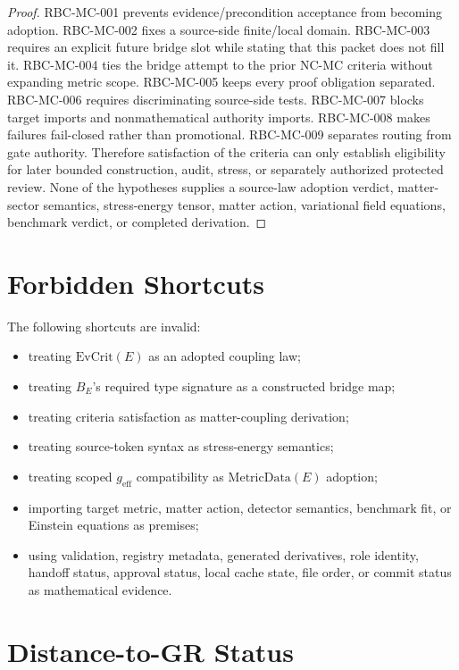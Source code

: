 \documentclass[11pt]{article}
\newcommand{\MetricData}{\mathrm{MetricData}}
\newcommand{\geff}{g_{\mathrm{eff}}}
\newcommand{\EvCrit}{\mathrm{EvCrit}}
\begin{document}
\begin{proof}
RBC-MC-001 prevents evidence/precondition acceptance from becoming adoption.
RBC-MC-002 fixes a source-side finite/local domain. RBC-MC-003 requires an
explicit future bridge slot while stating that this packet does not fill it.
RBC-MC-004 ties the bridge attempt to the prior NC-MC criteria without
expanding metric scope. RBC-MC-005 keeps every proof obligation separated.
RBC-MC-006 requires discriminating source-side tests. RBC-MC-007 blocks target
imports and nonmathematical authority imports. RBC-MC-008 makes failures
fail-closed rather than promotional. RBC-MC-009 separates routing from gate
authority. Therefore satisfaction of the criteria can only establish
eligibility for later bounded construction, audit, stress, or separately
authorized protected review. None of the hypotheses supplies a source-law
adoption verdict, matter-sector semantics, stress-energy tensor, matter
action, variational field equations, benchmark verdict, or completed
derivation.
\end{proof}

\section{Forbidden Shortcuts}

The following shortcuts are invalid:

\begin{itemize}[leftmargin=*]
  \item treating \(\EvCrit(E)\) as an adopted coupling law;
  \item treating \(B_E\)'s required type signature as a constructed bridge map;
  \item treating criteria satisfaction as matter-coupling derivation;
  \item treating source-token syntax as stress-energy semantics;
  \item treating scoped \(\geff\) compatibility as \(\MetricData(E)\)
  adoption;
  \item importing target metric, matter action, detector semantics,
  benchmark fit, or Einstein equations as premises;
  \item using validation, registry metadata, generated derivatives, role
  identity, handoff status, approval status, local cache state, file order, or
  commit status as mathematical evidence.
\end{itemize}

\section{Distance-to-GR Status}
\end{document}
